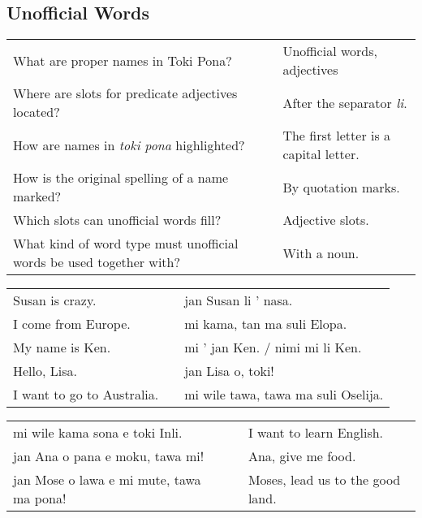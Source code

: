 \newpage
%
\subsection*{Unofficial Words} 
\label{'unofficial_words'}
%
\begin{supertabular}{p{5,5cm}|ll}
What are proper names in Toki Pona? && Unofficial words, adjectives \\ %
Where are slots for predicate adjectives located? && After the separator \textit{li}. \\ %
How are names in \textit{toki pona} highlighted? && The first letter is a capital letter. \\ %
How is the original spelling of a name marked? && By quotation marks.  \\ %
Which slots can unofficial words fill? && Adjective slots.  \\ %
What kind of word type must unofficial words be used together with? && With a noun. \\ %
\end{supertabular}

\begin{supertabular}{p{5,5cm}|ll}
Susan is crazy.  && jan Susan li ' nasa. \\ %
I come from Europe. && mi kama, tan ma suli Elopa. \\ %
My name is Ken.  && mi ' jan Ken. / nimi mi li Ken. \\ %
Hello, Lisa.  && jan Lisa o, toki! \\ %
I want to go to Australia. && mi wile tawa, tawa ma suli Oselija. \\  %
\end{supertabular}  

\begin{supertabular}{p{5,5cm}|ll}
mi wile kama sona e toki Inli.  && I want to learn English. \\
jan Ana o pana e moku, tawa mi!  && Ana, give me food. \\
jan Mose o lawa e mi mute, tawa ma pona!  && Moses, lead us to the good land. \\
\end{supertabular} 

\newpage
%
